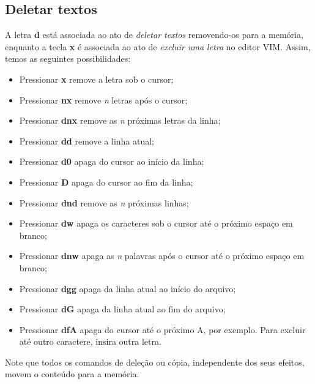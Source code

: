 \documentclass[12pt]{article}
\begin{document}
	\subsection{Deletar textos}
	A letra \textbf{d} está associada ao ato de \emph{deletar textos} removendo-os para a memória, enquanto a tecla \textbf{x}  é associada ao ato de \emph{excluir uma letra} no editor VIM. Assim, temos as seguintes possibilidades:
	\begin{itemize}
		\item Pressionar \textbf{x} remove a letra sob o cursor;
		\item Pressionar \textbf{nx} remove \emph{n} letras após o cursor;
		\item Pressionar \textbf{dnx} remove as \emph{n} próximas letras da linha;
		\item Pressionar \textbf{dd} remove a linha atual;
		\item Pressionar \textbf{d0} apaga do cursor ao início da linha;
		\item Pressionar \textbf{D} apaga do cursor ao fim da linha;
		\item Pressionar \textbf{dnd} remove as \emph{n} próximas linhas;
		\item Pressionar \textbf{dw} apaga os caracteres sob o cursor até o próximo espaço em branco;
		\item Pressionar \textbf{dnw} apaga as \emph{n} palavras após o cursor até o próximo espaço em branco;
		\item Pressionar \textbf{dgg} apaga da linha atual ao início do arquivo;
		\item Pressionar \textbf{dG} apaga da linha atual ao fim do arquivo;
		\item Pressionar \textbf{dfA} apaga do cursor até o próximo A, por exemplo. Para excluir até outro caractere, insira outra letra.
	\end{itemize}
	Note que todos os comandos de deleção ou cópia, independente dos seus efeitos, movem o conteúdo para a memória.
\end{document}
